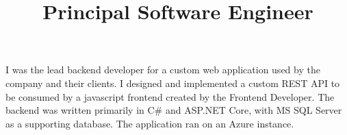 \title{\textbf{Principal Software Engineer}}
\begin{position}
I was the lead backend developer for a custom web application used by the
company and their clients. I designed and implemented a custom REST API to be
consumed by a javascript frontend created by the Frontend Developer. The
backend was written primarily in C\# and ASP.NET Core, with MS SQL Server as a
supporting database. The application ran on an Azure instance.
\end{position}

